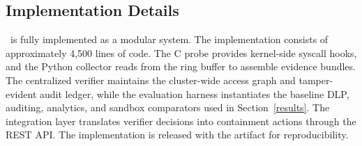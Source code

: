 \subsection{Implementation Details}

\projectname~is fully implemented as a modular system. The implementation consists of approximately 4,500 lines of code. The C \ebpf probe provides kernel-side syscall hooks, and the Python collector reads from the ring buffer to assemble evidence bundles. The centralized verifier maintains the cluster-wide access graph and tamper-evident audit ledger, while the evaluation harness instantiates the baseline DLP, auditing, analytics, and sandbox comparators used in Section~\ref{results}. The \slurm{} integration layer translates verifier decisions into containment actions through the REST API. The implementation is released with the artifact for reproducibility.

